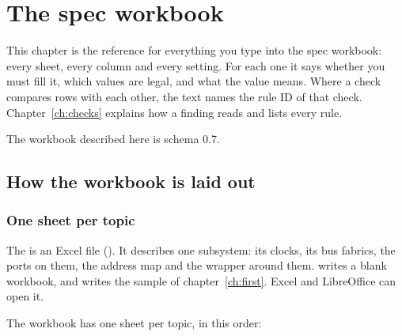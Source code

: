 \chapter{The spec workbook}
\label{ch:workbook}

This chapter is the reference for everything you type into the spec workbook: every
sheet, every column and every setting. For each one it says whether you must fill it,
which values are legal, and what the value means. Where a check compares rows with each
other, the text names the rule ID of that check. Chapter~\ref{ch:checks} explains how a
finding reads and lists every rule.

The workbook described here is schema 0.7.

\newenvironment{wbtable}[1]{%
  \par\small
  \begin{longtable}{@{}>{\raggedright\arraybackslash}p{3.3cm}%
      >{\raggedright\arraybackslash}p{1.7cm}%
      >{\raggedright\arraybackslash}p{4.1cm}%
      >{\raggedright\arraybackslash}p{5.6cm}@{}}
  \toprule
  \textbf{#1} & \textbf{Required} & \textbf{Values} & \textbf{Meaning}\\
  \midrule
  \endhead
  \bottomrule
  \endfoot}%
  {\end{longtable}\par}

\section{How the workbook is laid out}

\subsection{One sheet per topic}

The  is an Excel file (). It describes one subsystem:
its clocks, its bus fabrics, the ports on them, the address map and the wrapper around
them.  writes a blank workbook, and 
writes the  sample of chapter~\ref{ch:first}. Excel and LibreOffice can
open it.

The workbook has one sheet per topic, in this order:

